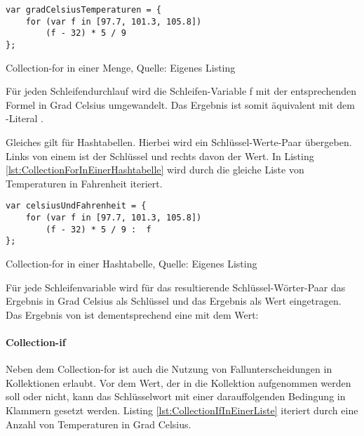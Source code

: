 \ifincludeall
  \begin{listing}[ht]
    \begin{verbatim}
var gradCelsiusTemperaturen = {
    for (var f in [97.7, 101.3, 105.8])
        (f - 32) * 5 / 9
};
\end{verbatim}
    \caption[Collection-for in einer Menge]{Collection-for in einer Menge, Quelle: Eigenes Listing}
    \label{lst:CollectionForInEinerMenge}
  \end{listing}
\fi

Für jeden Schleifendurchlauf wird die Schleifen-Variable f mit der entsprechenden Formel in Grad Celsius umgewandelt.
Das Ergebnis ist somit äquivalent mit dem -Literal .



Gleiches gilt für Hashtabellen.
Hierbei wird ein Schlüssel-Werte-Paar übergeben.
Links von einem \IC{:} ist der Schlüssel und rechts davon der Wert.
In Listing \ref{lst:CollectionForInEinerHashtabelle}
wird durch  die gleiche Liste von Temperaturen in Fahrenheit iteriert.

\ifincludeall
  \begin{listing}[ht]
    \begin{verbatim}
var celsiusUndFahrenheit = {
    for (var f in [97.7, 101.3, 105.8])
        (f - 32) * 5 / 9 :  f
};
\end{verbatim}
    \caption[Collection-for in einer Hashtabelle]{Collection-for in einer Hashtabelle, Quelle: Eigenes Listing}
    \label{lst:CollectionForInEinerHashtabelle}
  \end{listing}
\fi

 Für jede Schleifenvariable  wird für das resultierende Schlüssel-Wörter-Paar das Ergebnis in Grad Celsius als Schlüssel und das Ergebnis als Wert eingetragen.
Das Ergebnis von  ist dementsprechend eine  mit dem Wert: 



\paragraph{Collection-if}

Neben dem Collection-for ist auch die Nutzung von Fallunterscheidungen in Kollektionen erlaubt.
Vor dem Wert, der in die Kollektion aufgenommen werden soll oder nicht,  kann  das Schlüsselwort  mit einer darauffolgenden Bedingung in Klammern gesetzt werden.
Listing \ref{lst:CollectionIfInEinerListe} iteriert durch eine Anzahl von Temperaturen in Grad Celsius.

